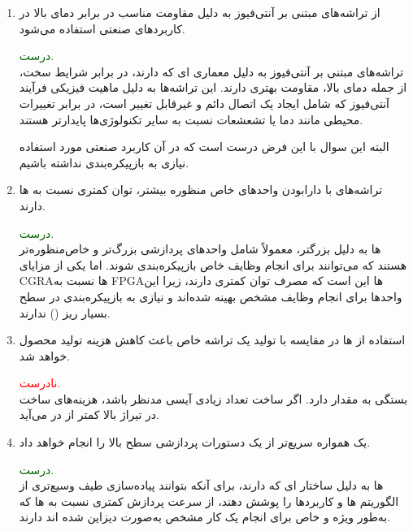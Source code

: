 \begin{enumerate}
	
	
	
	\item 
	از تراشه‌های مبتنی بر آنتی‌فیوز به دلیل مقاومت مناسب در برابر دمای بالا در کاربردهای صنعتی استفاده می‌شود.
	\begin{qsolve}
		\textcolor{darkgreen}{درست.}\\
		تراشه‌های مبتنی بر آنتی‌فیوز به دلیل معماری ای که دارند، در برابر شرایط سخت، از جمله دمای بالا، مقاومت بهتری دارند. این تراشه‌ها به دلیل ماهیت فیزیکی فرآیند آنتی‌فیوز که شامل ایجاد یک اتصال دائم و غیرقابل تغییر است، در برابر تغییرات محیطی مانند دما یا تشعشعات نسبت به سایر تکنولوژی‌ها پایدارتر هستند.
		
		البته این سوال با این فرض درست است که در آن کاربرد صنعتی مورد استفاده نیازی به بازپیکره‌بندی نداشته باشیم.
	\end{qsolve}
	
	
	
	
	\item 
	تراشه‌های  با دارابودن واحدهای خاص منظوره بیشتر، توان کمتری نسبت به ها دارند.
	\begin{qsolve}
		\textcolor{darkgreen}{درست.}\\
		 ها
		به دلیل  ‌بزرگتر، معمولاً شامل واحدهای پردازشی بزرگ‌تر و خاص‌منظوره‌تر هستند که می‌توانند برای انجام وظایف خاص بازپیکره‌بندی شوند. اما یکی از مزایای CGRAها نسبت به FPGAها این است که مصرف توان کمتری دارند، زیرا این واحدها برای انجام وظایف مشخص بهینه شده‌اند و نیازی به بازپیکره‌بندی در سطح بسیار ریز () ندارند.
		
	\end{qsolve}
	
	
	
	
	\item 
	استفاده از ها در مقایسه با تولید یک تراشه خاص باعث کاهش هزینه تولید محصول خواهد شد.
	\begin{qsolve}
		\textcolor{red}{نادرست.}\\
		بستگی به مقدار  دارد. اگر ساخت تعداد زیادی آیسی مدنظر باشد، هزینه‌های ساخت  در تیراژ بالا کمتر از  در می‌آید.
	
	\end{qsolve}
	
	
	
	
	\item 
	یک  همواره سریع‌تر از یک  دستورات پردازشی سطح بالا را انجام خواهد داد.
	\begin{qsolve}
		\textcolor{darkgreen}{درست.}\\
		\lr{FPGA}
		ها به دلیل ساختار  ای که دارند، برای آنکه بتوانند پیاده‌سازی طیف وسیع‌تری از الگوریتم ها و کاربرد‌ها را پوشش دهند، از سرعت پردازش کمتری نسبت به  ها که به‌طور ویژه و خاص برای انجام یک کار مشخص به‌صورت  دیزاین شده اند دارند.
		

\end{qsolve}
\end{enumerate}
